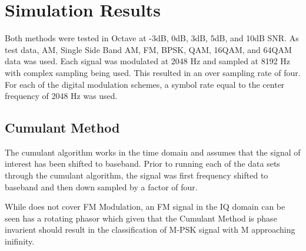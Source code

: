 \chapter{Simulation Results}

Both methods were tested in Octave at -3dB, 0dB, 3dB, 5dB, and 10dB SNR.  As
test data, AM, Single Side Band AM, FM, BPSK, QAM, 16QAM, and 64QAM data was
used.  Each signal was modulated at 2048 Hz and sampled at 8192 Hz with complex
sampling being used.  This resulted in an over sampling rate of four.  For each
of the digital modulation schemes, a symbol rate equal to the center frequency
of 2048 Hz was used.

\section{Cumulant Method}

The cumulant algorithm works in the time domain and assumes that the signal of
interest has been shifted to baseband.  Prior to running each of the data sets
through the cumulant algorithm, the signal was first frequency shifted to
baseband and then down sampled by a factor of four.  

While \cite{swami2000} does not cover FM Modulation, an FM signal in the IQ
domain can be seen has a rotating phasor which given that the Cumulant Method is
phase invarient should result in the classification of M-PSK signal with M
approaching inifinity.  


 
